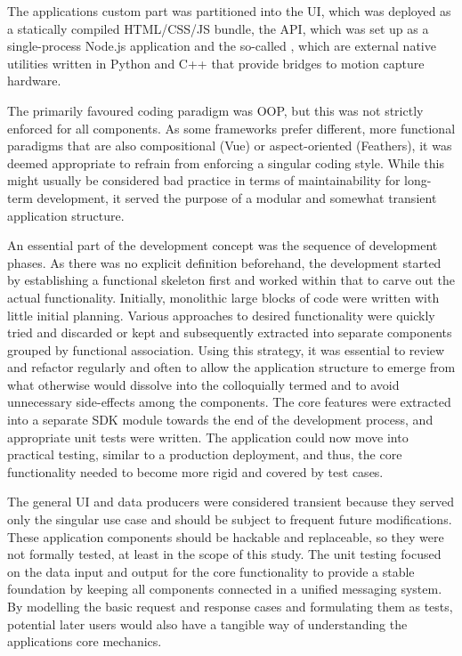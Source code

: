 The application\textquotesingle s custom part was partitioned into the \ac{UI}, which was deployed as a statically compiled \ac{HTML}/\ac{CSS}/\ac{JS} bundle, the \ac{API}, which was set up as a single-process Node.js application and the so-called , which are external native utilities written in Python and C++ that provide bridges to motion capture hardware.

The primarily favoured coding paradigm was \ac{OOP}, but this was not strictly enforced for all components.
As some frameworks prefer different, more functional paradigms that are also compositional (Vue) or aspect-oriented (Feathers), it was deemed appropriate to refrain from enforcing a singular coding style.
While this might usually be considered bad practice in terms of maintainability for long-term development, it served the purpose of a modular and somewhat transient  application structure.

An essential part of the development concept was the sequence of development phases.
As there was no explicit definition beforehand, the development started by establishing a functional skeleton first and worked within that to carve out the actual functionality.
Initially, monolithic large blocks of code were written with little initial planning.
Various approaches to desired functionality were quickly tried and discarded or kept and subsequently extracted into separate components grouped by functional association.
Using this strategy, it was essential to review and refactor regularly and often to allow the application structure to emerge from what otherwise would dissolve into the colloquially termed  and to avoid unnecessary side-effects among the components.
The core features were extracted into a separate \ac{SDK} module towards the end of the development process, and appropriate unit tests were written.
The application could now move into practical testing, similar to a production deployment, and thus, the core functionality needed to become more rigid and covered by test cases.

The general \ac{UI} and data producers were considered transient because they served only the singular use case and should be subject to frequent future modifications.
These application components should be hackable and replaceable, so they were not formally tested, at least in the scope of this study.
The unit testing focused on the data input and output for the core functionality to provide a stable foundation by keeping all components connected in a unified messaging system.
By modelling the basic request and response cases and formulating them as tests, potential later users would also have a tangible way of understanding the application\textquotesingle s core mechanics.

